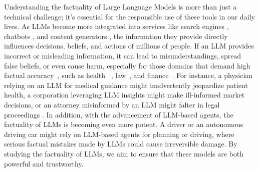 Understanding the factuality of Large Language Models is more than just a technical challenge; it's essential for the responsible use of these tools in our daily lives. As LLMs become more integrated into services like search engines \citep{BingChat}, chatbots \citep{chatgpt,bard}, and content generators \citep{ChatLaw}, the information they provide directly influences decisions, beliefs, and actions of millions of people. If an LLM provides incorrect or misleading information, it can lead to misunderstandings, spread false beliefs, or even cause harm, especially for those domains that demand high factual accuracy~\citep{ling2023beyond}, such as health ~\citep{thirunavukarasu2023large, tang-etal-2023-aligning}, law~\citep{huang2023lawyer}, and finance~\citep{BloombergGPT}. For instance, a physician relying on an LLM for medical guidance might inadvertently jeopardize patient health, a corporation leveraging LLM insights might make ill-informed market decisions, or an attorney misinformed by an LLM might falter in legal proceedings \citep{curran2023hallucination}.
In addition, with the advancement of LLM-based agents, the factuality of LLMs is becoming even more potent. A driver or an autonomous driving car might rely on LLM-based agents for planning or driving, where serious factual mistakes made by LLMs could cause irreversible damage.
By studying the factuality of LLMs, we aim to ensure that these models are both powerful and trustworthy.

